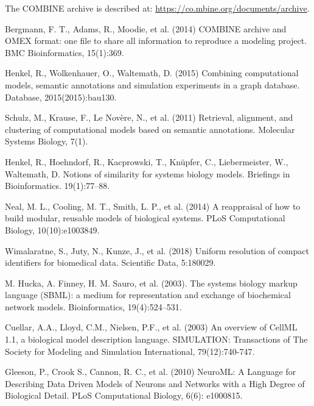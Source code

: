 \documentclass[pdftex,rgb,dvipsnames,svgnames,hyperref,table]{report}
\begin{document}
The COMBINE archive is described at: \url{https://co.mbine.org/documents/archive}.


\pagebreak



\begin{thebibliography}{9}

\vspace{5mm}

Bergmann, F. T., Adams, R., Moodie, et al. (2014) COMBINE archive and OMEX format: one file to share all information to reproduce a modeling project. BMC Bioinformatics, 15(1):369.

Henkel, R., Wolkenhauer, O., Waltemath, D. (2015) Combining computational models, semantic annotations and simulation experiments in a graph database. Database, 2015(2015):bau130.

Schulz, M., Krause, F., Le Novère, N., et al. (2011) 
Retrieval, alignment, and clustering of computational models based on semantic annotations. Molecular Systems Biology, 7(1).

Henkel, R., Hoehndorf, R., Kacprowski, T., Knüpfer, C., Liebermeister, W., Waltemath, D. Notions of similarity for systems biology models. Briefings in Bioinformatics. 19(1):77–88.

Neal, M. L., Cooling, M. T., Smith, L. P., et al. (2014) A reappraisal of how to build modular, reusable models of biological systems.
PLoS Computational Biology, 10(10):e1003849.

Wimalaratne, S., Juty, N., Kunze, J., et al. (2018)  Uniform resolution of compact identifiers for biomedical data. Scientific Data, 5:180029.

M. Hucka, A. Finney, H. M. Sauro, et al. (2003). The systems biology markup language (SBML): a medium for representation and exchange of biochemical network models. Bioinformatics, 19(4):524–531.

Cuellar, A.A., Lloyd, C.M., Nielsen, P.F., et al. (2003) An overview of CellML 1.1, a biological model description language. SIMULATION: Transactions of The Society for Modeling and Simulation International, 79(12):740-747.

Gleeson, P., Crook S., Cannon, R. C., et al. (2010) NeuroML: A Language for Describing Data Driven Models of Neurons and Networks with a High Degree of Biological Detail. PLoS Computational Biology, 6(6): e1000815.


\end{thebibliography}
\end{document}
